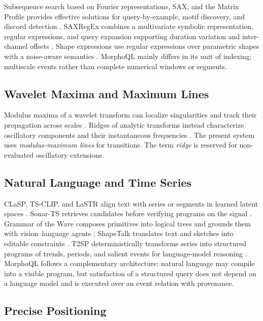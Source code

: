 \documentclass[11pt,a4paper]{article}
\begin{document}
Subsequence search based on Fourier representations, SAX, and the Matrix Profile provides effective solutions for query-by-example, motif discovery, and discord detection \cite{faloutsos1994,lin2007,yeh2016}. SAXRegEx combines a multivariate symbolic representation, regular expressions, and query expansion supporting duration variation and inter-channel offsets \cite{yu2023}. Shape expressions use regular expressions over parametric shapes with a noise-aware semantics \cite{nickovic2021}. MorphoQL mainly differs in its unit of indexing: multiscale events rather than complete numerical windows or segments.

\subsection{Wavelet Maxima and Maximum Lines}

Modulus maxima of a wavelet transform can localize singularities and track their propagation across scales \cite{mallat1992}. Ridges of analytic transforms instead characterize oscillatory components and their instantaneous frequencies \cite{lilly2010,lilly2017}. The present system uses \emph{modulus-maximum lines} for transitions. The term \emph{ridge} is reserved for non-evaluated oscillatory extensions.

\subsection{Natural Language and Time Series}

CLaSP, TS-CLIP, and LaSTR align text with series or segments in learned latent spaces \cite{ito2024,chen2025,dohi2026}. Sonar-TS retrieves candidates before verifying programs on the signal \cite{tan2026}. Grammar of the Wave composes primitives into logical trees and grounds them with vision--language agents \cite{wan2026}; ShapeTalk translates text and sketches into editable constraints \cite{sun2026}. T2SP deterministically transforms series into structured programs of trends, periods, and salient events for language-model reasoning \cite{kim2026}. MorphoQL follows a complementary architecture: natural language may compile into a visible program, but satisfaction of a structured query does not depend on a language model and is executed over an event relation with provenance.

\subsection{Precise Positioning}
\end{document}
